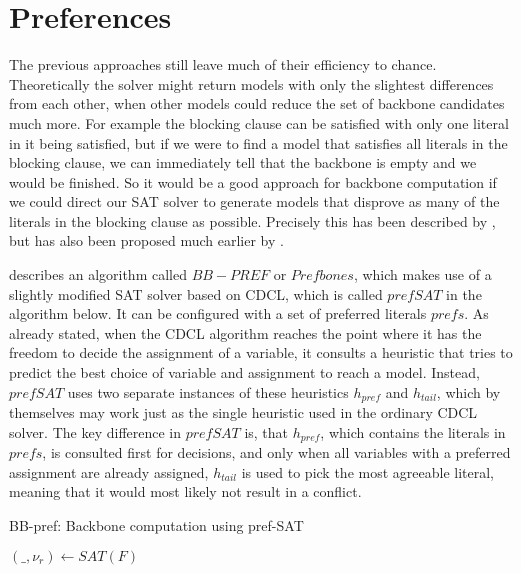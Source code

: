 \section{Preferences}
\label{ss:prefs}
The previous approaches still leave much of their efficiency to chance. Theoretically the solver might return models with only the slightest differences from each other, when other models could reduce the set of backbone candidates much more. For example the blocking clause can be satisfied with only one literal in it being satisfied, but if we were to find a model that satisfies all literals in the blocking clause, we can immediately tell that the backbone is empty and we would be finished. So it would be a good approach for backbone computation if we could direct our SAT solver to generate models that disprove as many of the literals in the blocking clause as possible. Precisely this has been described by \cite{PJ18}, but has also been proposed much earlier by \cite{kk01}. 

\cite{PJ18} describes an algorithm called $BB-PREF$ or $Prefbones$, which makes use of a slightly modified SAT solver based on CDCL, which is called $prefSAT$ in the algorithm below. It can be configured with a set of preferred literals $prefs$. As already stated, when the CDCL algorithm reaches the point where it has the freedom to decide the assignment of a variable, it consults a heuristic that tries to predict the best choice of variable and assignment to reach a model. Instead, $prefSAT$ uses two separate instances of these heuristics $h_{pref}$ and $h_{tail}$, which by themselves may work just as the single heuristic used in the ordinary CDCL solver. The key difference in $prefSAT$ is, that $h_{pref}$, which contains the literals in $prefs$, is consulted first for decisions, and only when all variables with a preferred assignment are already assigned, $h_{tail}$ is used to pick the most agreeable literal, meaning that it would most likely not result in a conflict.


\begin{algorithm}
\caption{{\sc BB-pref: Backbone computation using pref-SAT}}
\label{alg:pb0}
\DontPrintSemicolon
{}

$(\_,\nu_r) \gets SAT(F) $\;

\end{algorithm}

